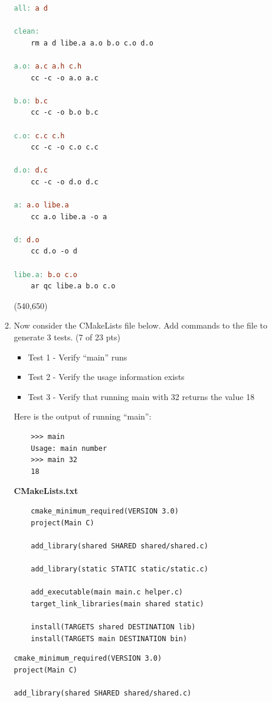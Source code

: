 \documentclass[10pt]{article}
\begin{document}
\begin{enumerate}
\begin{enumerate}
\beginanswers
\begin{lstlisting}[language=make]
all: a d

clean:
	rm a d libe.a a.o b.o c.o d.o 

a.o: a.c a.h c.h
	cc -c -o a.o a.c

b.o: b.c
	cc -c -o b.o b.c

c.o: c.c c.h
	cc -c -o c.o c.c

d.o: d.c
	cc -c -o d.o d.c

a: a.o libe.a
	cc a.o libe.a -o a

d: d.o
	cc d.o -o d

libe.a: b.o c.o
	ar qc libe.a b.o c.o

\end{lstlisting}
\else
\hspace*{-0.4in}\framebox(540,650){}
\fi
\newpage
	\item Now consider the CMakeLists file below. Add commands to the file to generate 3 tests.  (7 of 23 pts)
			
	\begin{itemize}
		\item Test 1 - Verify ``main'' runs
		\item Test 2 - Verify the usage information exists
		\item Test 3 - Verify that running main with 32 returns the value 18
	\end{itemize}

Here is the output of running ``main'':
\begin{lstlisting}
	>>> main
	Usage: main number
	>>> main 32
	18
\end{lstlisting}

\textbf{CMakeLists.txt} 
	\begin{lstlisting}
	cmake_minimum_required(VERSION 3.0)
	project(Main C)
	
	add_library(shared SHARED shared/shared.c)
	
	add_library(static STATIC static/static.c)
	
	add_executable(main main.c helper.c)
	target_link_libraries(main shared static)
	
	install(TARGETS shared DESTINATION lib)
	install(TARGETS main DESTINATION bin)
\end{lstlisting}

\beginanswers
\begin{lstlisting}[language=make]
cmake_minimum_required(VERSION 3.0)
project(Main C)

add_library(shared SHARED shared/shared.c)


\end{lstlisting}
\end{enumerate}
\end{enumerate}
\end{document}
